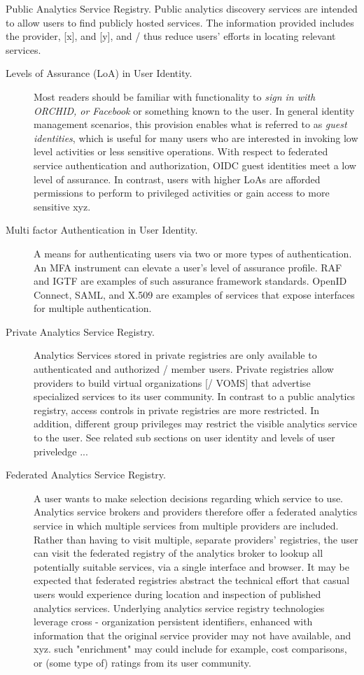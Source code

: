 Public Analytics Service Registry. Public analytics discovery
services are intended to allow users to find publicly hosted
services. The information provided includes the provider, [x], and
[y], and / thus reduce users' efforts in locating relevant services.

\begin{description}

\item[Levels of Assurance (LoA) in User Identity.] Most readers should
  be familiar with functionality to {\em sign in with ORCHID, or
    Facebook} or something known to the user. In general identity
  management scenarios, this provision enables what is referred to as
  {\em guest identities}, which is useful for many users who are
  interested in invoking low level activities or less sensitive
  operations. With respect to federated service authentication and
  authorization, OIDC guest identities meet a low level of
  assurance. In contrast, users with higher LoAs are afforded
  permissions to perform to privileged activities or gain access to
  more sensitive xyz.

\item[Multi factor Authentication in User Identity.] A means for
  authenticating users via two or more types of
  authentication. An MFA instrument can elevate a user's level of
  assurance profile. RAF and IGTF are examples of such assurance
  framework standards.  OpenID Connect, SAML, and X.509 are examples
  of services that expose interfaces for multiple authentication.

\item[Private Analytics Service Registry.] Analytics Services stored
  in private registries are only available to authenticated and
  authorized / member users. Private registries allow providers to
  build virtual organizations [/ VOMS] that advertise specialized
  services to its user community. In contrast to a public analytics
  registry, access controls in private registries are more
  restricted. In addition, different group privileges may restrict the
  visible analytics service to the user. See related sub sections on
  user identity and levels of user priveledge ...

\item[Federated Analytics Service Registry.] A user wants to make
  selection decisions regarding which service to use. Analytics
  service brokers and providers therefore offer a federated analytics
  service in which multiple services from multiple providers are
  included. Rather than having to visit multiple, separate providers'
  registries, the user can visit the federated registry of the
  analytics broker to lookup all potentially suitable services, via a
  single interface and  browser. It may be expected that federated
  registries abstract the technical effort that casual users would
  experience during location and inspection of published analytics
  services.  Underlying analytics service registry technologies
  leverage cross - organization persistent identifiers, enhanced with
  information that the original service provider may not have
  available, and xyz. such "enrichment" may could include for example,
  cost comparisons, or (some type of) ratings from its user community.


\end{description}

